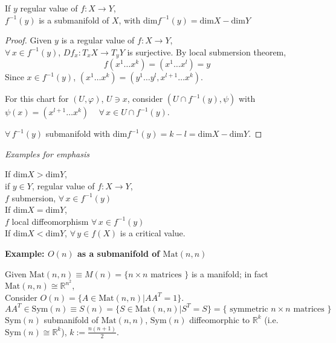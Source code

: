 \begin{theorem}
If $y$ regular value of $f:X\to Y$, \\
$f^{-1}(y)$ is a submanifold of $X$, with $\text{dim}f^{-1}(y)=\text{dim}X - \text{dim}Y$
\end{theorem}
\begin{proof}
Given $y$ is a regular value of $f:X\to Y$,  \\
$\forall \, x \in f^{-1}(y)$, $Df_x:T_xX \to T_yY$ is surjective.  By local submersion theorem, 
\[
f(x^1 \dots x^k) = (x^1 \dots x^l)=y
\]	
Since $x\in f^{-1}(y)$, $(x^1\dots x^k)=(y^1 \dots y^l,x^{l+1}\dots x^k)$.  

For this chart for $(U,\varphi)$, $U\ni x$, consider $(U\cap f^{-1}(y),\psi)$ with $\psi(x) = (x^{l+1}\dots x^k) \quad \, \forall \, x\in U\cap f^{-1}(y)$.  

$\forall \, f^{-1}(y)$ submanifold with $\text{dim}f^{-1}(y) = k-l = \text{dim}X-\text{dim}Y$.  
	\end{proof}

\emph{Examples for emphasis}

If $\text{dim}X > \text{dim}Y$, \\
\phantom{\qquad \, } if $y\in Y$, regular value of $f:X\to Y$, \\
\phantom{\qquad \, \qquad \, } $f$ submersion, $\forall \, x \in f^{-1}(y)$ \\
If $\text{dim}X = \text{dim}Y$, \\
\phantom{\qquad \, } $f$ local diffeomorphism $\forall \, x\in f^{-1}(y)$ \\
If $\text{dim}X < \text{dim}Y$, $\forall \, y\in f(X)$ is a critical value.  


\textbf{Example: $O(n)$ as a submanifold of $\text{Mat}(n,n)$}

Given $\text{Mat}(n,n)\equiv M(n) = \lbrace n \times n \text{ matrices } \rbrace$ is a manifold; in fact $\text{Mat}(n,n) \cong \mathbb{R}^{n^2}$, \\
Consider $O(n) = \lbrace A \in \text{Mat}(n,n) | AA^T = 1\rbrace$.  
\begin{equation}
AA^T \in \text{Sym}(n) \equiv S(n) = \lbrace S\in \text{Mat}(n,n) | S^T = S \rbrace = \lbrace \text{ symmetric $n\times n$ matrices } \rbrace
\end{equation}
$\text{Sym}(n)$ submanifold of $\text{Mat}(n,n)$, $\text{Sym}(n)$ diffeomorphic to $\mathbb{R}^k$ (i.e. $\text{Sym}(n) \cong \mathbb{R}^k$), $k:= \frac{n (n+1)}{2}$.  

